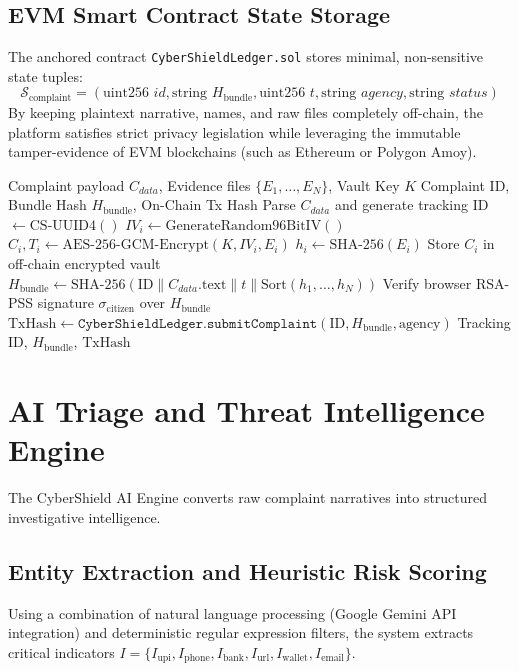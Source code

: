 \documentclass[conference]{IEEEtran}
\begin{document}
\subsection{EVM Smart Contract State Storage}
The anchored contract \texttt{CyberShieldLedger.sol} stores minimal, non-sensitive state tuples:
\begin{equation}
\mathcal{S}_{\text{complaint}} = \left( \text{uint256 } id, \text{string } H_{\text{bundle}}, \text{uint256 } t, \text{string } agency, \text{string } status \right)
\end{equation}
By keeping plaintext narrative, names, and raw files completely off-chain, the platform satisfies strict privacy legislation while leveraging the immutable tamper-evidence of EVM blockchains (such as Ethereum or Polygon Amoy).

\begin{algorithm}[h]
\caption{Complaint Intake and Cryptographic Verification}
\label{alg:intake}
\begin{algorithmic}[1]
\REQUIRE Complaint payload $C_{data}$, Evidence files $\{E_1, \dots, E_N\}$, Vault Key $K$
\ENSURE Complaint ID, Bundle Hash $H_{\text{bundle}}$, On-Chain Tx Hash
\STATE Parse $C_{data}$ and generate tracking ID $\leftarrow \text{CS-} \text{UUID4}()$
    \STATE $IV_i \leftarrow \text{GenerateRandom96BitIV}()$
    \STATE $C_i, T_i \leftarrow \text{AES-256-GCM-Encrypt}(K, IV_i, E_i)$
    \STATE $h_i \leftarrow \text{SHA-256}(E_i)$
    \STATE Store $C_i$ in off-chain encrypted vault
\ENDFOR
\STATE $H_{\text{bundle}} \leftarrow \text{SHA-256}(\text{ID} \parallel C_{data}.\text{text} \parallel t \parallel \text{Sort}(h_1, \dots, h_N))$
\STATE Verify browser RSA-PSS signature $\sigma_{\text{citizen}}$ over $H_{\text{bundle}}$
    \STATE $\text{TxHash} \leftarrow \texttt{CyberShieldLedger.submitComplaint}(\text{ID}, H_{\text{bundle}}, \text{agency})$
\ENDIF
\RETURN Tracking ID, $H_{\text{bundle}}$, $\text{TxHash}$
\end{algorithmic}
\end{algorithm}

\section{AI Triage and Threat Intelligence Engine}
The CyberShield AI Engine converts raw complaint narratives into structured investigative intelligence.

\subsection{Entity Extraction and Heuristic Risk Scoring}
Using a combination of natural language processing (Google Gemini API integration) and deterministic regular expression filters, the system extracts critical indicators $I = \{I_{\text{upi}}, I_{\text{phone}}, I_{\text{bank}}, I_{\text{url}}, I_{\text{wallet}}, I_{\text{email}}\}$.
\end{document}
